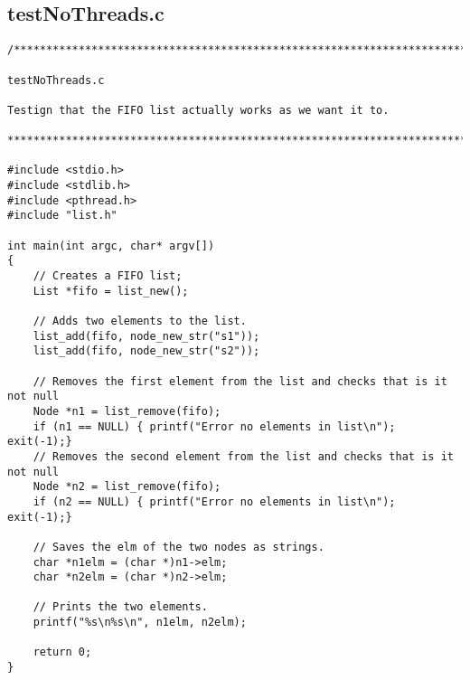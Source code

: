 \subsection{testNoThreads.c}
\begin{lstlisting}
/******************************************************************************

testNoThreads.c

Testign that the FIFO list actually works as we want it to.

******************************************************************************/

#include <stdio.h>
#include <stdlib.h>
#include <pthread.h>
#include "list.h"

int main(int argc, char* argv[])
{
    // Creates a FIFO list;
    List *fifo = list_new();

    // Adds two elements to the list.
    list_add(fifo, node_new_str("s1"));
    list_add(fifo, node_new_str("s2"));

    // Removes the first element from the list and checks that is it not null
    Node *n1 = list_remove(fifo);
    if (n1 == NULL) { printf("Error no elements in list\n"); exit(-1);}
    // Removes the second element from the list and checks that is it not null
    Node *n2 = list_remove(fifo);
    if (n2 == NULL) { printf("Error no elements in list\n"); exit(-1);}

    // Saves the elm of the two nodes as strings.
    char *n1elm = (char *)n1->elm;
    char *n2elm = (char *)n2->elm;

    // Prints the two elements.
    printf("%s\n%s\n", n1elm, n2elm);

    return 0;
}
\end{lstlisting}